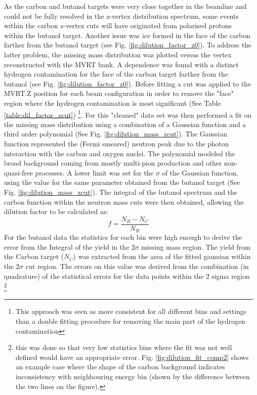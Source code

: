 As the carbon and butanol targets were very close together in the beamline and could not be fully resolved in the z-vertex distribution spectrum, some events within the carbon z-vertex cuts will have originated from polarised protons within the butanol target. Another issue was ice formed in the face of the carbon farther from the butanol target (see Fig. \ref{fig:dilution_factor_z0}). To address the latter problem, the missing mass distribution was plotted versus the vertex reconstructed with the MVRT bank. A dependence was found with a distinct hydrogen contamination for the face of the carbon target farther from the butanol (see Fig. \ref{fig:dilution_factor_z0}). Before fitting a cut was applied to the MVRT.Z position for each beam configuration in order to remove the "face" region where the hydrogen contamination is most significant (See Table \ref{table:dil_factor_zcut}) \footnote{This approach was seen as more consistent for all different bins and settings than a double fitting procedure for removing the main part of the hydrogen contamination}. For this "cleaned" data set was then performed a fit on the missing mass distribution using a combination of a Gaussian function and a third order polynomial (See Fig. \ref{fig:dilution_mass_zcut}). The Gaussian function represented the (Fermi smeared) neutron peak due to the photon interaction with the carbon and oxygen nuclei. The polynomial modeled the broad background coming from mostly multi-pion production and other non-quasi-free processes. A lower limit was set for the $\sigma$ of the Gaussian function, using the value for the same parameter obtained from the butanol target (See Fig. \ref{fig:dilution_mass_zcut}). The integral of the butanol spectrum and the carbon function within the neutron mass cuts were then obtained, allowing the dilution factor to be calculated as:
\begin{equation} \label{eqn:dil_factor}
  f = \frac{N_B - N_C}{N_B}
\end{equation}
For the butanol data the statistics for each bin were high enough to derive the error from the Integral of the yield in the $2\sigma$ missing mass region.  The yield from the Carbon target ($N_C$) was extracted from the area of the fitted gaussian within the $2 \sigma$ cut region. The errors on this value was derived from the combination (in quadrature) of the statistical errors for the data points within the 2 sigma region \footnote{this was done so that very low statistics bins where the fit was not well defined would have an appropriate error. Fig. \ref{fig:dilution_fit_comp2} shows an example case where the shape of the carbon background indicates inconsistency with neighbouring energy bin (shown by the difference between the two lines on the figure). }

